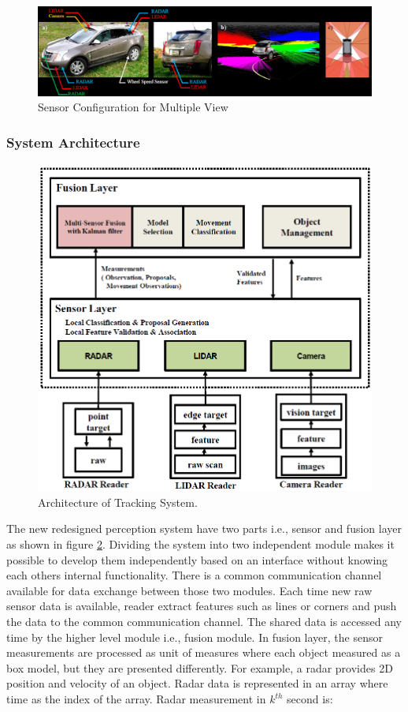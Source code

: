 \begin{figure}
  \centering
  \includegraphics[width=1\textwidth]{src/pic/Sensor_Setup_Multiple_View.png}
  \caption{Sensor Configuration for Multiple View \cite{Cho_2014}}
  \label{fig:Sensor_Setup_Multiple_View}
\end{figure}

\subsubsection{System Architecture}
\begin{figure}
  \centering
  \includegraphics[width=.6\textwidth]{src/pic/Fusion_Arch_Multiple_View.png}
  \caption{Architecture of Tracking System. \cite{Cho_2014}}
  \label{fig:Fusion_Arch_Multiple_View}
\end{figure}
The new redesigned perception system have two parts i.e., sensor and fusion layer as shown in figure \ref{fig:Fusion_Arch_Multiple_View}. Dividing the system into two independent module makes it possible to develop them independently based on an interface without knowing each others internal functionality. There is a common communication channel available for data exchange between those two modules. Each time new raw sensor data is available, reader extract features such as lines or corners and push the data to the common communication channel. The shared data is accessed any time by the higher level module i.e., fusion module. In fusion layer, the sensor measurements are processed as unit of measures where each object measured as a box model, but they are presented differently\cite{Cho_2014}. For example, a radar provides 2D position and velocity of an object. Radar data is represented in an array where time as the index of the array. Radar measurement in $k^{th}$ second  is:
